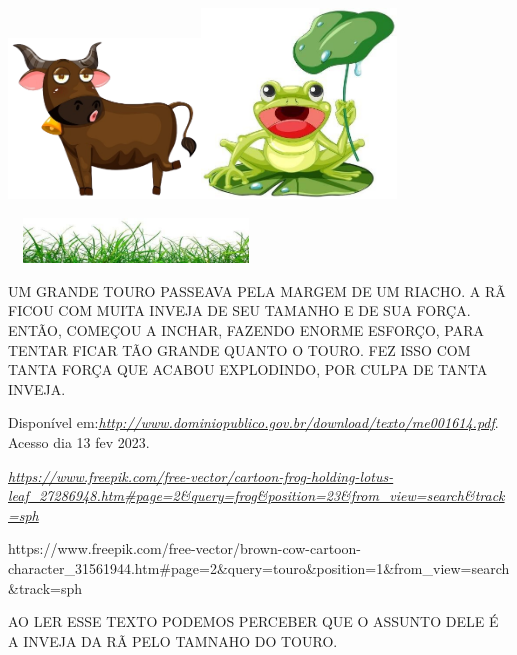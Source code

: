 \begin{escola}
\includegraphics[width=2.01214in,height=1.68750in]{media/image160.png}\includegraphics[width=2.04167in,height=1.99274in]{media/image161.jpg}

\includegraphics[width=2.66528in,height=0.47292in]{media/image162.jpg}

UM GRANDE TOURO PASSEAVA PELA MARGEM DE UM RIACHO. A RÃ FICOU COM MUITA
INVEJA DE SEU TAMANHO E DE SUA FORÇA. ENTÃO, COMEÇOU A INCHAR, FAZENDO
ENORME ESFORÇO, PARA TENTAR FICAR TÃO GRANDE QUANTO O TOURO. FEZ ISSO
COM TANTA FORÇA QUE ACABOU EXPLODINDO, POR CULPA DE TANTA INVEJA.

Disponível
em:\href{http://www.dominiopublico.gov.br/download/texto/me001614.pdf}{\emph{http://www.dominiopublico.gov.br/download/texto/me001614.pdf}}.
Acesso dia 13 fev 2023.

\href{https://www.freepik.com/free-vector/cartoon-frog-holding-lotus-leaf_27286948.htm\#page=2\&query=frog\&position=23\&from_view=search\&track=sph}{\emph{https://www.freepik.com/free-vector/cartoon-frog-holding-lotus-leaf\_27286948.htm\#page=2\&query=frog\&position=23\&from\_view=search\&track=sph}}

https://www.freepik.com/free-vector/brown-cow-cartoon-character\_31561944.htm\#page=2\&query=touro\&position=1\&from\_view=search\&track=sph

AO LER ESSE TEXTO PODEMOS PERCEBER QUE O ASSUNTO DELE É A INVEJA DA RÃ
PELO TAMNAHO DO TOURO.


\end{escola}
